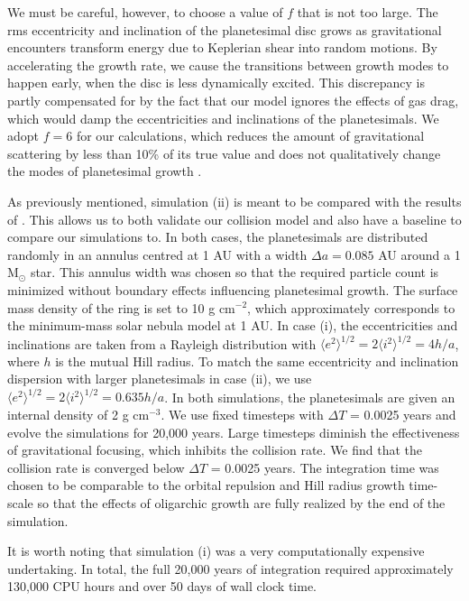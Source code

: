 \documentclass [11pt, proquest] {uwthesis}[2020/02/24]
\begin{document}
We must be careful, however, to choose a value of $f$ that is not too large. The rms eccentricity and inclination of the 
planetesimal disc grows as gravitational encounters transform energy due to Keplerian shear into random motions. By 
accelerating the growth rate, we cause the transitions between growth modes to happen early, when the disc is less dynamically 
excited. This discrepancy is partly compensated for by the fact that our model ignores the effects of gas drag, which would damp 
the eccentricities and inclinations of the planetesimals. We adopt $f=6$ for our calculations, which reduces the amount of 
gravitational scattering by less than 10\% of its true value and does not qualitatively change the modes of planetesimal growth 
\cite{kokubo98}.

\noindent As previously mentioned, simulation (ii) is meant to be compared with the results of \cite{kokubo98}. This allows us to 
both validate our collision model and also have a baseline to compare our simulations to. In both cases, the planetesimals are 
distributed randomly in an annulus centred at 1 AU with a width $\Delta a = 0.085$ AU around a 1 $\mathrm{M_{\odot}}$ star. 
This annulus width was chosen so that the required particle count is minimized without boundary effects influencing planetesimal 
growth. The surface mass density of the ring is set to 10 g cm$^{-2}$, which approximately corresponds to the minimum-mass 
solar nebula model \cite{hayashi81} at 1 AU. In case (i), the eccentricities and inclinations are taken from a Rayleigh distribution 
\cite{ida92} with $\langle e^2 \rangle^{1/2} = 2 \langle i^2 \rangle^{1/2} = 4 h/a$, where $h$ is the mutual Hill radius. To match 
the same eccentricity and inclination dispersion with larger planetesimals in case (ii), we use $\langle e^2 \rangle^{1/2} = 2 
\langle i^2 \rangle^{1/2} = 0.635 h/a$. In both simulations, the planetesimals are given an internal density of 2 g cm$^{-3}$. We 
use fixed timesteps with $\Delta T$ = 0.0025 years and evolve the simulations for 20,000 years. Large timesteps diminish the 
effectiveness of gravitational focusing, which inhibits the collision rate. We find that the collision rate is converged below $\Delta 
T$ = 0.0025 years. The integration time was chosen to be comparable to the orbital repulsion and Hill radius growth time-scale 
\cite{kokubo95} so that the effects of oligarchic growth are fully realized by the end of the simulation.

It is worth noting that simulation (i) was a very computationally expensive undertaking. In total, the full 20,000 years of 
integration required approximately 130,000 CPU hours and over 50 days of wall clock time.
\end{document}
